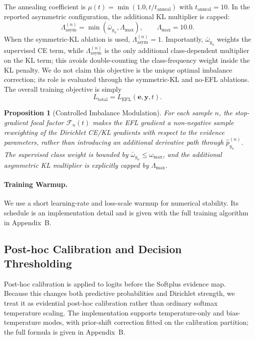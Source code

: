 \documentclass[letterpaper]{article} %
\newtheorem{proposition}{Proposition}
\begin{document}
The annealing coefficient is $\mu(t)=\min(1.0,t/t_{\text{anneal}})$ with $t_{\text{anneal}}=10$. In the reported asymmetric configuration, the additional KL multiplier is capped:
\begin{equation}\label{eq:asym_multiplier}
    \Lambda_{\text{asym}}^{(n)}
    =
    \min(\bar{\omega}_{y_n},\Lambda_{\max}),
    \qquad \Lambda_{\max}=10.0 .
\end{equation}
When the symmetric-KL ablation is used, $\Lambda_{\text{asym}}^{(n)}=1$. Importantly, $\bar{\omega}_{y_n}$ weights the supervised CE term, while $\Lambda_{\text{asym}}^{(n)}$ is the only additional class-dependent multiplier on the KL term; this avoids double-counting the class-frequency weight inside the KL penalty. We do not claim this objective is the unique optimal imbalance correction; its role is evaluated through the symmetric-KL and no-EFL ablations.
The overall training objective is simply
\begin{equation}\label{eq:total_loss}
    L_{\text{total}}=L_{\text{EFL}}(\bm{e},\bm{y},t).
\end{equation}

\begin{proposition}[Controlled Imbalance Modulation]
\label{prop:controlled_modulation}
For each sample $n$, the stop-gradient focal factor $\mathcal{F}_n(t)$ makes the EFL gradient a non-negative sample reweighting of the Dirichlet CE/KL gradients with respect to the evidence parameters, rather than introducing an additional derivative path through $\hat{p}_{y_n}^{(n)}$. The supervised class weight is bounded by $\bar{\omega}_{y_n}\le\omega_{\max}$, and the additional asymmetric KL multiplier is explicitly capped by $\Lambda_{\max}$.
\end{proposition}

\paragraph{Training Warmup.}
We use a short learning-rate and loss-scale warmup for numerical stability. Its schedule is an implementation detail and is given with the full training algorithm in Appendix~B.

\subsection{Post-hoc Calibration and Decision Thresholding}
Post-hoc calibration is applied to logits before the Softplus evidence map. Because this changes both predictive probabilities and Dirichlet strength, we treat it as evidential post-hoc calibration rather than ordinary softmax temperature scaling. The implementation supports temperature-only and bias-temperature modes, with prior-shift correction fitted on the calibration partition; the full formula is given in Appendix~B.
\end{document}
